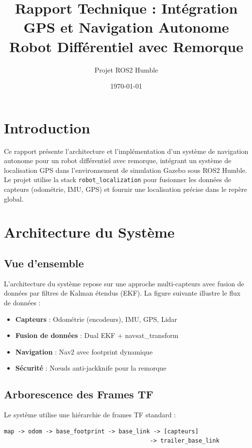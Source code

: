 \documentclass[a4paper,12pt]{article}
\title{\textbf{Rapport Technique : Intégration GPS et Navigation Autonome\\ Robot Différentiel avec Remorque}}
\author{Projet ROS2 Humble}
\date{\today}
\begin{document}
\maketitle

\tableofcontents
\newpage

\section{Introduction}

Ce rapport présente l'architecture et l'implémentation d'un système de navigation autonome pour un robot différentiel avec remorque, intégrant un système de localisation GPS dans l'environnement de simulation Gazebo sous ROS2 Humble. Le projet utilise la stack \texttt{robot\_localization} pour fusionner les données de capteurs (odométrie, IMU, GPS) et fournir une localisation précise dans le repère global.

\section{Architecture du Système}

\subsection{Vue d'ensemble}

L'architecture du système repose sur une approche multi-capteurs avec fusion de données par filtres de Kalman étendus (EKF). La figure suivante illustre le flux de données :

\begin{itemize}
    \item \textbf{Capteurs} : Odométrie (encodeurs), IMU, GPS, Lidar
    \item \textbf{Fusion de données} : Dual EKF + navsat\_transform
    \item \textbf{Navigation} : Nav2 avec footprint dynamique
    \item \textbf{Sécurité} : Nœuds anti-jackknife pour la remorque
\end{itemize}

\subsection{Arborescence des Frames TF}

Le système utilise une hiérarchie de frames TF standard :
\begin{verbatim}
map -> odom -> base_footprint -> base_link -> [capteurs]
                                          -> trailer_base_link
\end{verbatim}
\end{document}
